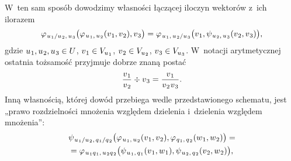 \documentclass[a4paper,11pt]{article}
\numberwithin{equation}{section}
\begin{document}
W~ten sam sposób dowodzimy własności łączącej iloczyn wektorów z~ich
ilorazem
\begin{equation}
  \label{eq:Mechanika-Rozwazania-ogolne-28}
  \varphi_{ \hspace{0.07em} u_{ \hspace{0.05em} 1 } / u_{ \hspace{0.05em} 2 }, \,
    u_{ \hspace{0.05em} 3 } }\big(
  \varphi_{ \hspace{0.07em} u_{ \hspace{0.05em} 1 }, \, u_{ \hspace{0.05em} 2 } }(
  v_{ \hspace{0.05em} 1 }, v_{ \hspace{0.05em} 2 } ), v_{ \hspace{0.05em} 3 } \big) =
  \varphi_{ \hspace{0.07em} u_{ \hspace{0.05em} 1 }, \,
    u_{ \hspace{0.05em} 2 } / u_{ \hspace{0.05em} 3 } }\big(
  v_{ \hspace{0.05em} 1 },
  \psi_{ \hspace{0.07em} u_{ \hspace{0.05em} 2 }, \, u_{ \hspace{0.05em} 3 } }(
  v_{ \hspace{0.05em} 2 }, v_{ \hspace{0.05em} 3 } ) \big),
\end{equation}
gdzie
$u_{ \hspace{0.05em} 1 }, u_{ \hspace{0.05em} 2 }, u_{ \hspace{0.05em} 3 } \in U$,
$v_{ \hspace{0.05em} 1 } \in V_{ u_{ \hspace{0.05em} 1 } }$,
$v_{ \hspace{0.05em} 2 } \in V_{ u_{ \hspace{0.05em} 2 } }$,
$v_{ \hspace{0.05em} 3 } \in V_{ u_{ \hspace{0.05em} 3 } }$. W~notacji arytmetycznej
ostatnia tożsamość przyjmuje dobrze znaną postać
\begin{equation}
  \label{eq:Mechanika-Rozwazania-ogolne-29}
  \frac{ v_{ \hspace{0.05em} 1 } }{ v_{ \hspace{0.05em} 2 } } \div
  v_{ \hspace{0.05em} 3 } =
  \frac{ v_{ \hspace{0.05em} 1 } }{ v_{ \hspace{0.05em} 2 } \hspace{0.05em}
    v_{ \hspace{0.05em} 3 } }.
\end{equation}
Inną własnością, której dowód przebiega wedle przedstawionego schematu,
jest „prawo rozdzielności mnożenia względem dzielenia i~dzielenia względem
mnożenia”:
\begin{equation}
  \label{eq:Mechanika-Rozwazania-ogolne-30}
  \begin{split}
    &\psi_{ \hspace{0.07em} u_{ \hspace{0.05em} 1 } / u_{ \hspace{0.05em} 2 }, \,
      q_{ \hspace{0.05em} 1 } / q_{ \hspace{0.07em} 2 } }\big(
      \varphi_{ \hspace{0.07em} u_{ \hspace{0.05em} 1 }, \, u_{ \hspace{0.05em}2 } }(
      v_{ \hspace{0.05em} 1 }, v_{ \hspace{0.05em} 2 } ),
      \varphi_{ \hspace{0.07em} q_{ \hspace{0.05em} 1 }, \, q_{ \hspace{0.07em} 2 } }(
      w_{ \hspace{0.05em} 1 }, w_{ \hspace{0.05em} 2 } ) \big) = \\
    &=
      \varphi_{ \hspace{0.07em} u_{ \hspace{0.05em} 1 } q_{ \hspace{0.05em} 1 }, \,
      u_{ \hspace{0.05em} 2 } q_{ \hspace{0.07em} 2 } }\big(
      \psi_{ \hspace{0.07em} u_{ \hspace{0.05em} 1 }, \, q_{ \hspace{0.05em} 1 } }(
      v_{ \hspace{0.05em} 1 }, w_{ \hspace{0.05em} 1 } ),
      \psi_{ \hspace{0.07em} u_{ \hspace{0.05em} 2 }, \, q_{ \hspace{0.07em} 2 } }(
      v_{ \hspace{0.05em} 2 }, w_{ \hspace{0.05em} 2 } ) \big),
  \end{split}
\end{equation}
\end{document}
